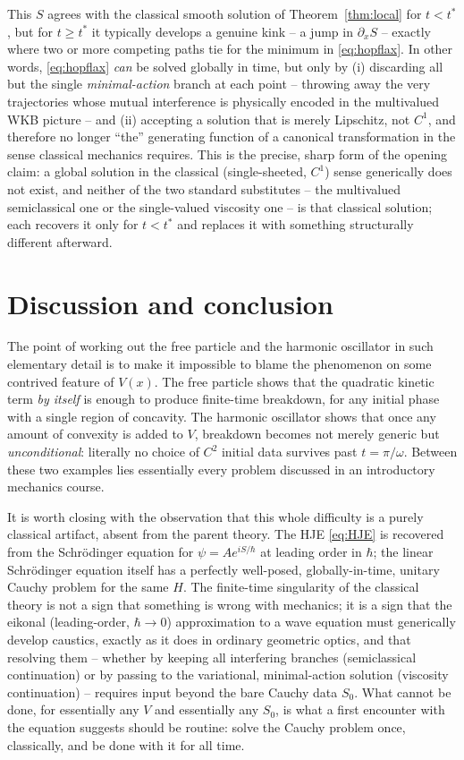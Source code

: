 \documentclass[11pt]{article}
\theoremstyle{plain}
\theoremstyle{definition}
\theoremstyle{remark}
\begin{document}
This $S$ agrees with the classical smooth solution of Theorem~\ref{thm:local}
for $t<t^\ast$, but for $t\ge t^\ast$ it typically develops a genuine kink -- a
jump in $\partial_xS$ -- exactly where two or more competing paths tie for the
minimum in \eqref{eq:hopflax}. In other words, \eqref{eq:hopflax} \emph{can} be
solved globally in time, but only by (i) discarding all but the single
\emph{minimal-action} branch at each point -- throwing away the very
trajectories whose mutual interference is physically encoded in the multivalued
WKB picture -- and (ii) accepting a solution that is merely Lipschitz, not
$C^1$, and therefore no longer ``the'' generating function of a canonical
transformation in the sense classical mechanics requires. This is the precise,
sharp form of the opening claim: a global solution in the classical
(single-sheeted, $C^1$) sense generically does not exist, and neither of the
two standard substitutes -- the multivalued semiclassical one or the
single-valued viscosity one -- is that classical solution; each recovers it
only for $t<t^\ast$ and replaces it with something structurally different
afterward.

\section{Discussion and conclusion}

The point of working out the free particle and the harmonic oscillator in such
elementary detail is to make it impossible to blame the phenomenon on some
contrived feature of $V(x)$. The free particle shows that the quadratic kinetic
term \emph{by itself} is enough to produce finite-time breakdown, for any
initial phase with a single region of concavity. The harmonic oscillator shows
that once any amount of convexity is added to $V$, breakdown becomes not merely
generic but \emph{unconditional}: literally no choice of $C^2$ initial data
survives past $t=\pi/\omega$. Between these two examples lies essentially every
problem discussed in an introductory mechanics course.

It is worth closing with the observation that this whole difficulty is a purely
classical artifact, absent from the parent theory. The HJE \eqref{eq:HJE} is
recovered from the Schr\"odinger equation for $\psi=Ae^{iS/\hbar}$ at leading
order in $\hbar$; the linear Schr\"odinger equation itself has a perfectly
well-posed, globally-in-time, unitary Cauchy problem for the same $H$. The
finite-time singularity of the classical theory is not a sign that something is
wrong with mechanics; it is a sign that the eikonal (leading-order,
$\hbar\to0$) approximation to a wave equation must generically develop
caustics, exactly as it does in ordinary geometric optics, and that resolving
them -- whether by keeping all interfering branches (semiclassical
continuation) or by passing to the variational, minimal-action solution
(viscosity continuation) -- requires input beyond the bare Cauchy data $S_0$.
What cannot be done, for essentially any $V$ and essentially any $S_0$, is what
a first encounter with the equation suggests should be routine: solve the
Cauchy problem once, classically, and be done with it for all time.
\end{document}
